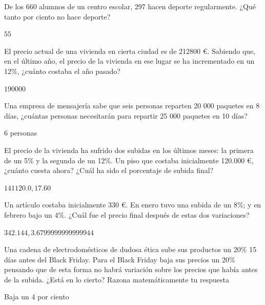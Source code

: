 \documentclass[addpoints,spanish, 12pt,a4paper]{exam}
\begin{document}
\begin{questions}

\question [2] De los 660 alumnos de un centro escolar, 297 hacen deporte regularmente. ¿Qué tanto por ciento no hace deporte?

\begin{solution}$55$\end{solution}

\addpoints


\question [2] 
El precio actual de una vivienda en cierta ciudad es de 212800 \euro. Sabiendo que, en el último año, el precio de la vivienda en ese lugar se ha incrementado en un 12\%, ¿cuánto costaba el año pasado?
\begin{solution}
$190000$
\end{solution}

\question [2] Una empresa de mensajería sabe que seis personas reparten 20 000 paquetes en 8 días, ¿cuántas personas necesitarán para repartir 25 000 paquetes en 10 días?
\begin{solution}
6 personas
\end{solution}

\question [2] El precio de la vivienda ha sufrido dos subidas en los últimos meses: la primera de un 5\% y la segunda de un 12\%. Un piso que costaba inicialmente 120.000 \euro, ¿cuánto cuesta ahora? ¿Cuál ha sido el porcentaje de subida final?
\begin{solution}
$141120.0, 17.60$
\end{solution}


\question [2] Un artículo costaba inicialmente 330 \euro. En enero tuvo una subida de un 8\%; y en febrero bajo un 4\%. ¿Cuál fue el precio final después de estas dos variaciones?
\begin{solution}
$342.144, 3.6799999999999944$
\end{solution}

\question [2] Una cadena de electrodomésticos de dudosa ética sube sus productos un 20\% 15 días antes del Black Friday. Para el Black Friday baja sus precios un 20\% pensando que de esta forma no habrá variación sobre los precios que había antes de la subida. ¿Está en lo cierto? Razona matemáticamente tu respuesta
\begin{solution}
Baja un 4 por ciento 
\end{solution}




\addpoints

\end{questions}
\end{document}
